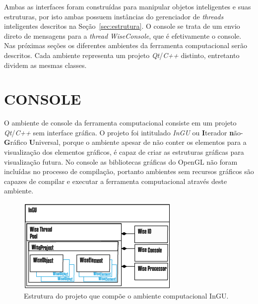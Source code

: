 Ambas as interfaces foram construídas para manipular objetos inteligentes e suas estruturas, por isto ambas possuem instâncias do gerenciador de \textit{threads} inteligentes descritos na Seção~\ref{sec:estrutura}. O console se trata de um envio direto de mensagens para a \textit{thread} \textit{WiseConsole}, que é efetivamente o console. Nas próximas seções os diferentes ambientes da ferramenta computacional serão descritos. Cada ambiente representa um projeto \textit{Qt}/\textit{C++} distinto, entretanto dividem as mesmas classes.

\section{CONSOLE}\label{sec:console}

O ambiente de console da ferramenta computacional consiste em um projeto \textit{Qt}/\textit{C++} sem interface gráfica. O projeto foi intitulado \textit{InGU} ou \textbf{I}terador \textbf{n}ão-\textbf{G}ráfico \textbf{U}niversal, porque o ambiente apesar de não conter os elementos para a visualização dos elementos gráficos, é capaz de criar as estruturas gráficas para visualização futura.  No console as bibliotecas gráficas do OpenGL não foram incluídas no processo de compilação, portanto ambientes sem recursos gráficos são capazes de compilar e executar a ferramenta computacional através deste ambiente.

\begin{figure}[!htbp]
	\centering
	\includegraphics[width=\linewidth]{Figures/InGU.png}
	\caption{Estrutura do projeto que compõe o ambiente computacional InGU.}
	\label{fig10:console}
\end{figure}

